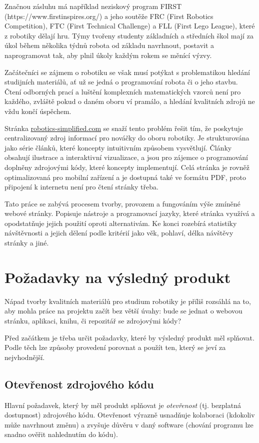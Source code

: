 \documentclass[a4paper, 12pt]{article}
\begin{document}
  Značnou zásluhu má například neziskový program FIRST (https://www.firstinspires.org/) a jeho soutěže FRC (First Robotics Competition), FTC (First Technical Challenge) a FLL (First Lego League), které z robotiky dělají hru. Týmy tvořeny studenty základních a středních škol mají za úkol během několika týdnů robota od základu navrhnout, postavit a naprogramovat tak, aby plnil úkoly každým rokem se měnící výzvy.

  Začátečníci se zájmem o robotiku se však musí potýkat s problematikou hledání studijních materiálů, ať už se jedná o programování robota či o jeho stavbu. Čtení odborných prací a luštění komplexních matematických vzorců není pro každého, zvláště pokud o daném oboru ví pramálo, a hledání kvalitních zdrojů ne vždu končí úspěchem.

  Stránka \url{robotics-simplified.com} se snaží tento problém řešit tím, že poskytuje centralizovaný zdroj informací pro nováčky do oboru robotiky. Je strukturována jako série článků, které koncepty intuitivním způsobem vysvětlují. Články obsahují ilustrace a interaktivní vizualizace, a jsou pro zájemce o programování doplněny zdrojovými kódy, které koncepty implementují. Celá stránka je rovněž optimalizovaná pro mobilní zařízení a je dostupná také ve formátu PDF, proto připojení k internetu není pro čtení stránky třeba.

  Tato práce se zabývá procesem tvorby, provozem a fungováním výše zmíněné webové stránky. Popisuje nástroje a programovací jazyky, které stránka využívá a opodstatňuje jejich použití oproti alternativám. Ke konci rozebírá statistiky návštěvnosti a jejich dělení podle kritérií jako věk, pohlaví, délka návštěvy stránky a jiné.

  \newpage

  \section{Požadavky na výsledný produkt}
  Nápad tvorby kvalitních materiálů pro studium robotiky je příliš rozsáhlá na to, aby mohla práce na projektu začít bez větší úvahy: bude se jednat o webovou stránku, aplikaci, knihu, či repozitář se zdrojovými kódy?

  Před začátkem je třeba určit požadavky, které by výsledný produkt měl splňovat. Podle těch lze způsoby provedení porovnat a použít ten, který se jeví za nejvhodnější.


  \subsection{Otevřenost zdrojového kódu}
  Hlavní požadavek, který by měl produkt splňovat je \emph{otevřenost} (tj. bezplatná dostupnost) zdrojového kódu. Otevřenost výrazně usnadňuje kolaboraci (kdokoliv může navrhnout změnu) a zvyšuje důvěru v daný software (chování programu lze snadno ověřit nahlednutím do kódu).
\end{document}
